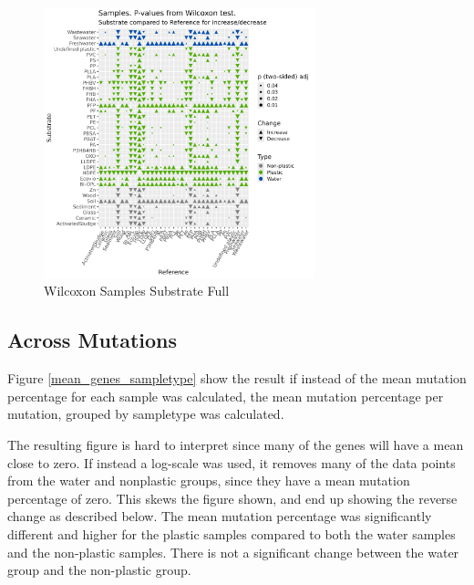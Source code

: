 \begin{figure}[h]
    \centering
    \includegraphics[width = 0.7\textwidth]{figure/wilcox_samples_substrates.png}
    \caption{Wilcoxon Samples Substrate Full}
    \label{wilcox_samples_substrates_full}
\end{figure}


\subsection{Across Mutations}
Figure \ref{mean_genes_sampletype} show the result if instead of the mean mutation percentage for each sample was calculated, the mean mutation percentage per mutation, grouped by sampletype was calculated.  

The resulting figure is hard to interpret since many of the genes will have a mean close to zero. If instead a log-scale was used, it removes many of the data points from the water and nonplastic groups, since they have a mean mutation percentage of zero. This skews the figure shown, and end up showing the reverse change as described below. 
The mean mutation percentage was significantly different and higher for the plastic samples compared to both the water samples and the non-plastic samples. There is not a significant change between the water group and the non-plastic group.

